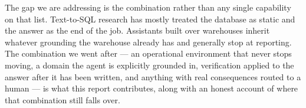 The gap we are addressing is the combination rather than any single capability
on that list. Text-to-SQL research has mostly treated the database as static and
the answer as the end of the job. Assistants built over warehouses inherit
whatever grounding the warehouse already has and generally stop at reporting.
The combination we went after --- an operational environment that never stops
moving, a domain the agent is explicitly grounded in, verification applied to
the answer after it has been written, and anything with real consequences routed
to a human --- is what this report contributes, along with an honest account of
where that combination still falls over.
